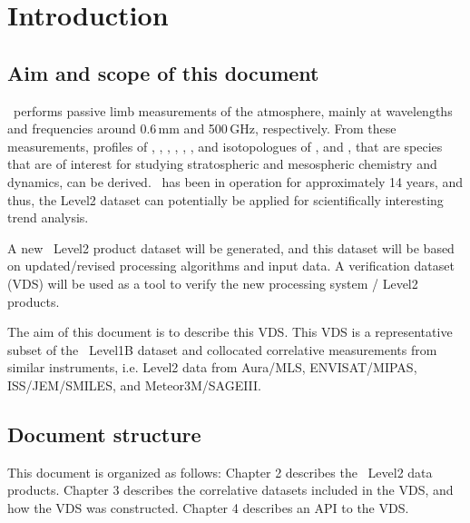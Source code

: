 \chapter{Introduction}
\label{chapter:introduction}


\setcounter{page}{1}


\section{Aim and scope of this document}
\label{sec:aim}
\smr\ performs passive limb measurements of the atmosphere,
mainly at wavelengths and frequencies around 0.6\,mm and 500\,GHz,
respectively.
From these measurements, profiles of 
, , , , 
, , and isotopologues of , and ,
that are species that are of interest for studying stratospheric and 
mesospheric chemistry and dynamics, can be derived. 
\smr\ has been in operation for approximately 14 years, and thus, the Level2
dataset can potentially be applied for scientifically interesting trend analysis.

A new \smr\ Level2 product dataset will be generated, and this dataset will be based
on updated/revised processing algorithms and input data.
A verification dataset (VDS) will be used as a tool to verify the new 
processing system / Level2 products.

The aim of this document is to describe this VDS.
This VDS is a representative subset of the \smr\ Level1B dataset
and collocated correlative measurements from similar
instruments, i.e. Level2 data from Aura/MLS, ENVISAT/MIPAS,
ISS/JEM/SMILES, and Meteor3M/SAGEIII.   


\section{Document structure}

This document is organized as follows:
Chapter 2 describes the \smr\ Level2 data products.
Chapter 3 describes the correlative datasets
included in the VDS, and how the VDS was constructed.
Chapter 4 describes an API to the VDS.

